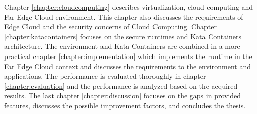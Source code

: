 Chapter \ref{chapter:cloudcomputing} describes virtualization, cloud computing and Far Edge Cloud environment. This chapter also discusses the requirements of Edge Cloud and the security concerns of Cloud Computing. Chapter \ref{chapter:katacontainers} focuses on the secure runtimes and Kata Containers architecture. The environment and Kata Containers are combined in a more practical chapter \ref{chapter:implementation} which implements the runtime in the Far Edge Cloud context and discusses the requirements to the environment and applications. The performance is evaluated thoroughly in chapter \ref{chapter:evaluation} and the performance is analyzed based on the acquired results. The last chapter \ref{chapter:discussion} focuses on the gaps in provided features, discusses the possible improvement factors, and concludes the thesis.